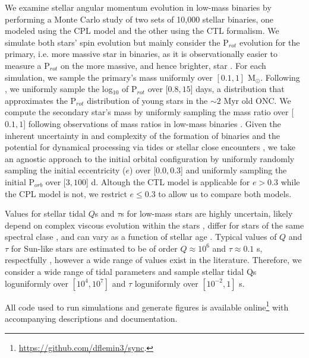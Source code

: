 \documentclass[twocolumn]{aastex61}
\begin{document}
We examine stellar angular momentum evolution in low-mass binaries by performing a Monte Carlo study of two sets of 10,000 stellar binaries, one modeled using the CPL model and the other using the CTL formalism.  We simulate both stars' spin evolution but mainly consider the P$_{rot}$ evolution for the primary, i.e. more massive star in binaries, as it is observationally easier to measure a P$_{rot}$ on the more massive, and hence brighter, star \citep[e.g.][]{Meibom2006,Lurie2017}. For each simulation, we sample the primary's mass uniformly over $[0.1, 1]$ M$_{\odot}$. Following \citet{Matt2015}, we uniformly sample the log$_{10}$ of P$_{rot}$ over [$0.8,15$] days, a distribution that approximates the P$_{rot}$ distribution of young stars in the ${\sim}2$ Myr old ONC.  We compute the secondary star's mass by uniformly sampling the mass ratio over [$0.1, 1$] following observations of mass ratios in low-mass binaries \citep{Raghavan2010,Moe2018}. Given the inherent uncertainty in and complexity of the formation of binaries \citep[e.g.][]{Bonnell1994,Bate2000,Bate2002,Moe2018} and the potential for dynamical processing via tides or stellar close encounters \citep[e.g.][]{Mardling2001,Hurley2002,Ivanova2005,Meibom2005}, we take an agnostic approach to the initial orbital configuration by uniformly randomly sampling the initial eccentricity ($e$) over [$0.0,0.3$] and uniformly sampling the initial P$_{orb}$ over [$3,100$] d. Altough the CTL model is applicable for $e > 0.3$ while the CPL model is not, we restrict $e \leq 0.3$ to allow us to compare both models.

Values for stellar tidal $Q$s and $\tau$s for low-mass stars are highly uncertain, likely depend on complex viscous evolution within the stars \citep{Ogilvie2007}, differ for stars of the same spectral clase \citep{Barker2009}, and can vary as a function of stellar age \citep{Bolmont2016}. Typical values of $Q$ and $\tau$ for Sun-like stars are estimated to be of order $Q \approx 10^6$ and $\tau \approx 0.1$ s, respectfully \citep[e.g.][]{Meibom2005,Ogilvie2007,Jackson2009}, however a wide range of values exist in the literature.  Therefore, we consider a wide range of tidal parameters and sample stellar tidal Qs loguniformly over $[10^4,10^7]$ and $\tau$ loguniformly over $[10^{-2},1]$ s.

All code used to run simulations and generate figures is available online\footnote{\href{https://github.com/dflemin3/sync}{https://github.com/dflemin3/sync}.} with accompanying descriptions and documentation.
\end{document}
